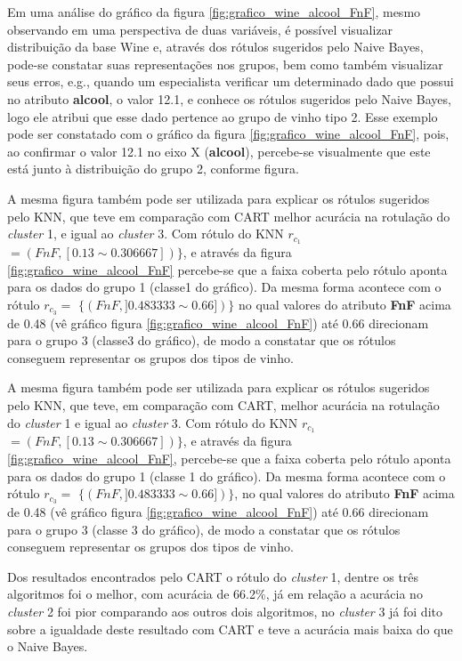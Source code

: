 Em uma análise do gráfico da figura \ref{fig:grafico_wine_alcool_FnF}, mesmo observando em uma perspectiva de duas variáveis, é possível visualizar distribuição da base Wine  e, através dos rótulos sugeridos pelo Naive Bayes, pode-se constatar suas representações nos grupos, bem como também visualizar seus erros, e.g., quando um especialista verificar um determinado dado que possui no atributo \textbf{alcool}, o valor 12.1, e conhece os rótulos sugeridos pelo Naive Bayes, logo ele atribui que esse dado pertence ao grupo de vinho tipo 2. Esse exemplo pode ser constatado com o gráfico da figura \ref{fig:grafico_wine_alcool_FnF}, pois, ao confirmar o valor 12.1 no eixo X (\textbf{alcool}), percebe-se visualmente que este está junto à distribuição do grupo 2, conforme figura. 

A mesma figura também pode ser utilizada para explicar os rótulos sugeridos pelo KNN, que teve em comparação com CART melhor acurácia na rotulação do \textit{cluster} 1, e igual ao \textit{cluster} 3. Com rótulo do KNN ${r_{c_1}}$ ${=(FnF, [ 0.13 \sim  0.306667  ] ) \} }$, e através da figura \ref{fig:grafico_wine_alcool_FnF} percebe-se que a faixa coberta pelo rótulo aponta para os dados do grupo 1 (classe1 do gráfico). Da mesma forma acontece com o rótulo ${r_{c_3}=}$ ${\{ (FnF, ] 0.483333 \sim  0.66 ])\} }$ no qual valores do atributo \textbf{FnF} acima de 0.48 (vê gráfico figura \ref{fig:grafico_wine_alcool_FnF}) até 0.66 direcionam para o grupo 3 (classe3 do gráfico), de modo a constatar que os rótulos conseguem representar os grupos dos tipos de vinho.

A mesma figura também pode ser utilizada para explicar os rótulos sugeridos pelo KNN, que teve, em comparação com CART, melhor acurácia na rotulação do \textit{cluster} 1 e igual ao \textit{cluster} 3. Com rótulo do KNN ${r_{c_1}}$ ${=(FnF, [ 0.13 \sim  0.306667  ] ) \} }$, e através da figura \ref{fig:grafico_wine_alcool_FnF}, percebe-se que a faixa coberta pelo rótulo aponta para os dados do grupo 1 (classe 1 do gráfico). Da mesma forma acontece com o rótulo ${r_{c_3}=}$ ${\{ (FnF, ] 0.483333 \sim  0.66 ])\} }$, no qual valores do atributo \textbf{FnF} acima de 0.48 (vê gráfico figura \ref{fig:grafico_wine_alcool_FnF}) até 0.66 direcionam para o grupo 3 (classe 3 do gráfico), de modo a constatar que os rótulos conseguem representar os grupos dos tipos de vinho.

Dos resultados encontrados pelo CART o rótulo do \textit{cluster} 1, dentre os três algoritmos foi o melhor, com acurácia de 66.2\%, já em relação a acurácia no \textit{cluster} 2 foi pior comparando aos outros dois algoritmos, no \textit{cluster} 3 já foi dito sobre a igualdade deste resultado com CART e teve a acurácia mais baixa do que o Naive Bayes.

